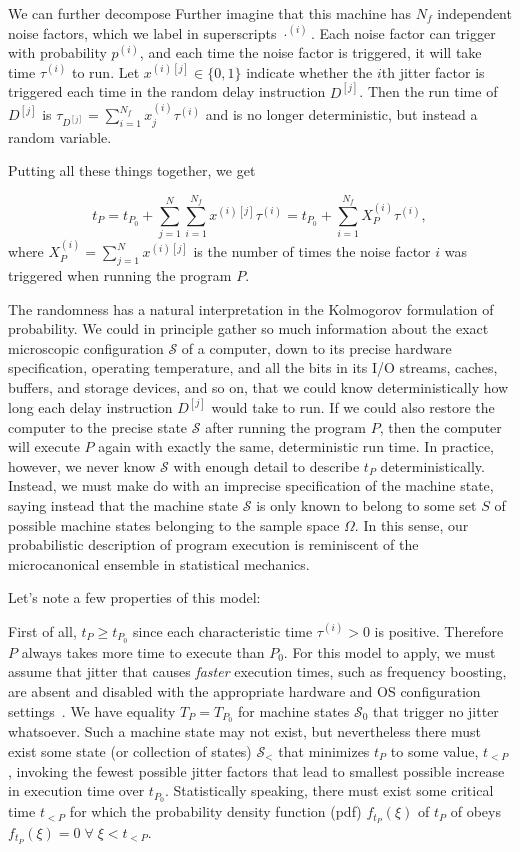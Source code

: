 \documentclass[conference]{IEEEtran}
\begin{document}
We can further decompose
Further imagine that this machine has $N_f$ independent noise factors, which we label in superscripts $\cdot^{(i)}$. Each noise factor can trigger with probability $p^{(i)}$, and each time the noise factor is triggered, it will take time $\tau^{(i)}$ to run. Let $x^{(i)[j]} \in \{0, 1\}$ indicate whether the $i$th jitter factor is triggered each time in the random delay instruction $D^{[j]}$. Then the run time of $D^{[j]}$ is
$\tau_{D^{[j]}} = \sum_{i=1}^{N_f} x^{(i)}_j \tau^{(i)}$ and is no longer deterministic, but instead a random variable.

Putting all these things together, we get

\begin{equation}
t_P = t_{P_0} + \sum_{j=1}^N \sum_{i=1}^{N_f} x^{(i)[j]} \tau^{(i)}
= t_{P_0} + \sum_{i=1}^{N_f} X_P^{(i)} \tau^{(i)},
\end{equation}
%
where $X_P^{(i)} = \sum_{j=1}^N x^{(i)[j]}$ is the number of times the noise factor $i$ was triggered when running the program $P$.

The randomness has a natural interpretation in the Kolmogorov formulation of probability. We could in principle gather so much information about the exact microscopic configuration $\mathcal S$ of a computer, down to its precise hardware specification, operating temperature, and all the bits in its I/O streams, caches, buffers, and storage devices, and so on, that we could know deterministically how long each delay instruction $D^{[j]}$ would take to run. If we could also restore the computer to the precise state $\mathcal S$ after running the program $P$, then the computer will execute $P$ again with exactly the same, deterministic run time. In practice, however, we never know $\mathcal S$ with enough detail to describe $t_P$ deterministically. Instead, we must make do with an imprecise specification of the machine state, saying instead that the machine state $\mathcal S$ is only known to belong to some set $S$ of possible machine states belonging to the sample space $\Omega$. In this sense, our probabilistic description of program execution is reminiscent of the microcanonical ensemble in statistical mechanics.

Let's note a few properties of this model:

First of all, $t_P \ge t_{P_0}$ since each characteristic time $\tau^{(i)} > 0$ is positive. Therefore $P$ always takes more time to execute than $P_0$.
For this model to apply, we must assume that jitter that causes \textit{faster}
execution times, such as frequency boosting, are absent and disabled with the
appropriate hardware and OS configuration settings~\cite{benchmarktoolschecklist}. We have equality $T_P = T_{P_0}$
for machine states $\mathcal S_0$ that trigger no jitter whatsoever. Such a machine state may not exist, but nevertheless there must exist some state (or collection of states) $\mathcal S_<$ that minimizes $t_P$ to some value, $t_{<P}$, invoking the fewest possible jitter factors that lead to smallest possible increase in execution time over $t_{P_0}$.
Statistically speaking, there must exist some critical time $t_{<P}$ for which the probability density function (pdf) $f_{t_P}(\xi)$ of $t_P$ of obeys $f_{t_P}(\xi) = 0 \; \forall \; \xi < t_{<P}$.
\end{document}
